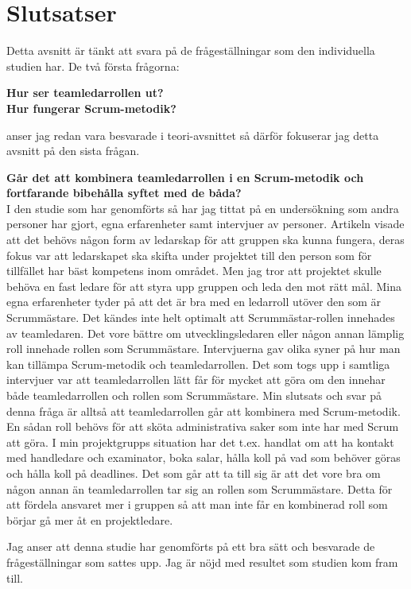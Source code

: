 \section{Slutsatser}
Detta avsnitt är tänkt att svara på de frågeställningar som den individuella studien har. De två första frågorna:

\textbf{Hur ser teamledarrollen ut?}\\
\textbf{Hur fungerar Scrum-metodik?}

anser jag redan vara besvarade i teori-avsnittet så därför fokuserar jag detta avsnitt på den sista frågan.

\textbf{Går det att kombinera teamledarrollen i en Scrum-metodik och fortfarande bibehålla syftet med de båda?}\\
I den studie som har genomförts så har jag tittat på en undersökning som andra personer har gjort, egna erfarenheter samt intervjuer av personer. 
Artikeln visade att det behövs någon form av ledarskap för att gruppen ska kunna fungera, deras fokus var att ledarskapet ska skifta under projektet till den person som för tillfället har bäst kompetens inom området. Men jag tror att projektet skulle behöva en fast ledare för att styra upp gruppen och leda den mot rätt mål.
Mina egna erfarenheter tyder på att det är bra med en ledarroll utöver den som är Scrummästare. 
Det kändes inte helt optimalt att Scrummästar-rollen innehades av teamledaren. 
Det vore bättre om utvecklingsledaren eller någon annan lämplig roll innehade rollen som Scrummästare. 
Intervjuerna gav olika syner på hur man kan tillämpa Scrum-metodik och teamledarrollen. 
Det som togs upp i samtliga intervjuer var att teamledarrollen lätt får för mycket att göra om den innehar både teamledarrollen och rollen som Scrummästare.
Min slutsats och svar på denna fråga är alltså att teamledarrollen går att kombinera med Scrum-metodik. 
En sådan roll behövs för att sköta administrativa saker som inte har med Scrum att göra. 
I min projektgrupps situation har det t.ex. handlat om att ha kontakt med handledare och examinator, boka salar, hålla koll på vad som behöver göras och hålla koll på deadlines. 
Det som går att ta till sig är att det vore bra om någon annan än teamledarrollen tar sig an rollen som Scrummästare. 
Detta för att fördela ansvaret mer i gruppen så att man inte får en kombinerad roll som börjar gå mer åt en projektledare. 

Jag anser att denna studie har genomförts på ett bra sätt och besvarade de frågeställningar som sattes upp. Jag är nöjd med resultet som studien kom fram till.
